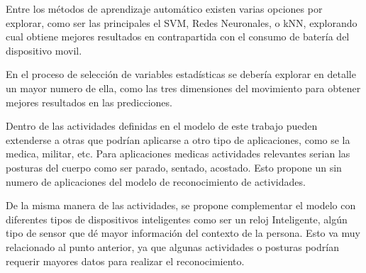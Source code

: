 Entre los métodos de aprendizaje automático existen varias opciones por explorar, como ser las principales el SVM, Redes Neuronales, o kNN, explorando cual obtiene mejores resultados en contrapartida con el consumo de batería del dispositivo movil.

En el proceso de selección de variables estadísticas se debería explorar en detalle un mayor numero de ella, como las tres dimensiones del movimiento para obtener mejores resultados en las predicciones. 

Dentro de las actividades definidas en el modelo de este trabajo pueden extenderse a otras que podrían aplicarse a otro tipo de aplicaciones, como se la medica, militar, etc. Para aplicaciones medicas actividades relevantes serian las posturas del cuerpo como ser parado, sentado, acostado. Esto propone un sin numero de aplicaciones del modelo de reconocimiento de actividades. 

De la misma manera de las actividades, se propone complementar el modelo con diferentes tipos de dispositivos inteligentes como ser un reloj Inteligente, algún tipo de sensor que dé mayor información del contexto de la persona. Esto va muy relacionado al punto anterior, ya que algunas actividades o posturas podrían requerir mayores datos para realizar el reconocimiento.


